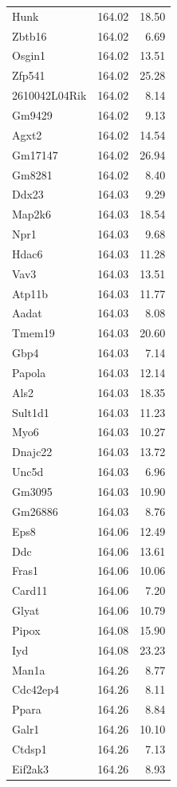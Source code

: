 \documentclass[oneside]{book}\usepackage[]{graphicx}\usepackage[]{color}
\begin{document}
\begin{appendices}
{\begin{longtable}{lrr}
  Hunk & 164.02 & 18.50 \\
  Zbtb16 & 164.02 & 6.69 \\
  Osgin1 & 164.02 & 13.51 \\
  Zfp541 & 164.02 & 25.28 \\
  2610042L04Rik & 164.02 & 8.14 \\
  Gm9429 & 164.02 & 9.13 \\
  Agxt2 & 164.02 & 14.54 \\
  Gm17147 & 164.02 & 26.94 \\
  Gm8281 & 164.02 & 8.40 \\
  Ddx23 & 164.03 & 9.29 \\
  Map2k6 & 164.03 & 18.54 \\
  Npr1 & 164.03 & 9.68 \\
  Hdac6 & 164.03 & 11.28 \\
  Vav3 & 164.03 & 13.51 \\
  Atp11b & 164.03 & 11.77 \\
  Aadat & 164.03 & 8.08 \\
  Tmem19 & 164.03 & 20.60 \\
  Gbp4 & 164.03 & 7.14 \\
  Papola & 164.03 & 12.14 \\
  Als2 & 164.03 & 18.35 \\
  Sult1d1 & 164.03 & 11.23 \\
  Myo6 & 164.03 & 10.27 \\
  Dnajc22 & 164.03 & 13.72 \\
  Unc5d & 164.03 & 6.96 \\
  Gm3095 & 164.03 & 10.90 \\
  Gm26886 & 164.03 & 8.76 \\
  Eps8 & 164.06 & 12.49 \\
  Ddc & 164.06 & 13.61 \\
  Fras1 & 164.06 & 10.06 \\
  Card11 & 164.06 & 7.20 \\
  Glyat & 164.06 & 10.79 \\
  Pipox & 164.08 & 15.90 \\
  Iyd & 164.08 & 23.23 \\
  Man1a & 164.26 & 8.77 \\
  Cdc42ep4 & 164.26 & 8.11 \\
  Ppara & 164.26 & 8.84 \\
  Galr1 & 164.26 & 10.10 \\
  Ctdsp1 & 164.26 & 7.13 \\
  Eif2ak3 & 164.26 & 8.93 \\

\end{longtable}}
\end{appendices}
\end{document}
